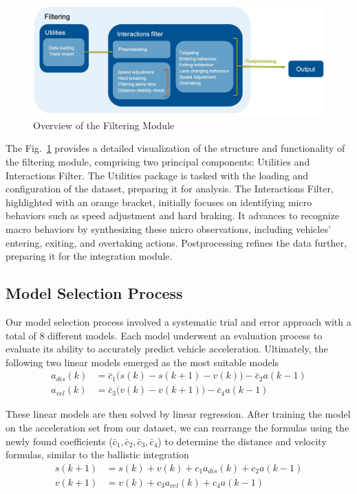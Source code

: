 \begin{figure}[h]
\centering
\includegraphics[width=\columnwidth]{./images/figures/filtering_module.jpeg}
\caption{Overview of the Filtering Module}
\label{fig:filtering_module}
\end{figure}

The Fig.~\ref{fig:filtering_module} provides a detailed visualization of the structure and functionality of the filtering module, comprising two principal components: Utilities and Interactions Filter. The Utilities package is tasked with the loading and configuration of the dataset, preparing it for analysis. The Interactions Filter, highlighted with an orange bracket, initially focuses on identifying micro behaviors such as speed adjustment and hard braking. It advances to recognize macro behaviors by synthesizing these micro observations, including vehicles' entering, exiting, and overtaking actions. Postprocessing refines the data further, preparing it for the integration module. 

\subsection{Model Selection Process} 
Our model selection process involved a systematic trial and error approach with a total of 8 different models. 
Each model underwent an evaluation process to evaluate its ability to accurately predict vehicle acceleration. 
Ultimately, the following two linear models emerged as the most suitable models
\begin{align} 
    a_{dis}(k) &= \bar{c}_1 \bigl( s(k) - s(k+1) - v(k) \bigr) -\bar{c}_2 a(k-1) \\
    a_{vel}(k) &= \bar{c}_3 \bigl( v(k) - v(k+1) \bigr) -\bar{c}_4 a(k-1) 
\end{align}

These linear models are then solved by linear regression. 
After training the model on the acceleration set from our dataset, we can rearrange the formulas using the newly found coefficients ($\bar c_1,\bar c_2,\bar c_3,\bar c_4$)
to determine the distance and velocity formulas, similar to the ballistic integration
\begin{align} 
    s(k+1) &= s(k) + v(k) + c_1 a_{dis}(k) + c_2 a(k-1) \\
    v(k+1) &= v(k)        + c_3 a_{vel}(k) + c_4 a(k-1)
\end{align}


